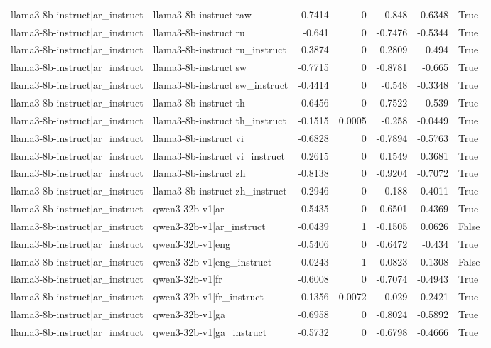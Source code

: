 \begin{table}
\begin{tabular}{l l r r r r l}
llama3-8b-instruct|ar_instruct & llama3-8b-instruct|raw & -0.7414 & 0 & -0.848 & -0.6348 & True \\
llama3-8b-instruct|ar_instruct & llama3-8b-instruct|ru & -0.641 & 0 & -0.7476 & -0.5344 & True \\
llama3-8b-instruct|ar_instruct & llama3-8b-instruct|ru_instruct & 0.3874 & 0 & 0.2809 & 0.494 & True \\
llama3-8b-instruct|ar_instruct & llama3-8b-instruct|sw & -0.7715 & 0 & -0.8781 & -0.665 & True \\
llama3-8b-instruct|ar_instruct & llama3-8b-instruct|sw_instruct & -0.4414 & 0 & -0.548 & -0.3348 & True \\
llama3-8b-instruct|ar_instruct & llama3-8b-instruct|th & -0.6456 & 0 & -0.7522 & -0.539 & True \\
llama3-8b-instruct|ar_instruct & llama3-8b-instruct|th_instruct & -0.1515 & 0.0005 & -0.258 & -0.0449 & True \\
llama3-8b-instruct|ar_instruct & llama3-8b-instruct|vi & -0.6828 & 0 & -0.7894 & -0.5763 & True \\
llama3-8b-instruct|ar_instruct & llama3-8b-instruct|vi_instruct & 0.2615 & 0 & 0.1549 & 0.3681 & True \\
llama3-8b-instruct|ar_instruct & llama3-8b-instruct|zh & -0.8138 & 0 & -0.9204 & -0.7072 & True \\
llama3-8b-instruct|ar_instruct & llama3-8b-instruct|zh_instruct & 0.2946 & 0 & 0.188 & 0.4011 & True \\
llama3-8b-instruct|ar_instruct & qwen3-32b-v1|ar & -0.5435 & 0 & -0.6501 & -0.4369 & True \\
llama3-8b-instruct|ar_instruct & qwen3-32b-v1|ar_instruct & -0.0439 & 1 & -0.1505 & 0.0626 & False \\
llama3-8b-instruct|ar_instruct & qwen3-32b-v1|eng & -0.5406 & 0 & -0.6472 & -0.434 & True \\
llama3-8b-instruct|ar_instruct & qwen3-32b-v1|eng_instruct & 0.0243 & 1 & -0.0823 & 0.1308 & False \\
llama3-8b-instruct|ar_instruct & qwen3-32b-v1|fr & -0.6008 & 0 & -0.7074 & -0.4943 & True \\
llama3-8b-instruct|ar_instruct & qwen3-32b-v1|fr_instruct & 0.1356 & 0.0072 & 0.029 & 0.2421 & True \\
llama3-8b-instruct|ar_instruct & qwen3-32b-v1|ga & -0.6958 & 0 & -0.8024 & -0.5892 & True \\
llama3-8b-instruct|ar_instruct & qwen3-32b-v1|ga_instruct & -0.5732 & 0 & -0.6798 & -0.4666 & True \\

\end{tabular}
\end{table}
